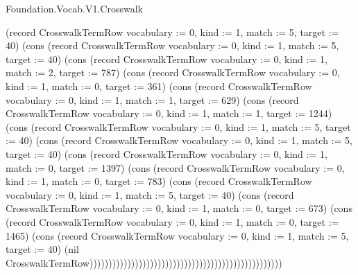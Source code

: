 \begin{lexlean}{Foundation.Vocab.V1.Crosswalk}
\begin{semanticmodule}
{(record CrosswalkTermRow {vocabulary := 0, kind := 1, match := 5, target := 40}) (cons (record CrosswalkTermRow {vocabulary := 0, kind := 1, match := 5, target := 40}) (cons (record CrosswalkTermRow {vocabulary := 0, kind := 1, match := 2, target := 787}) (cons (record CrosswalkTermRow {vocabulary := 0, kind := 1, match := 0, target := 361}) (cons (record CrosswalkTermRow {vocabulary := 0, kind := 1, match := 1, target := 629}) (cons (record CrosswalkTermRow {vocabulary := 0, kind := 1, match := 1, target := 1244}) (cons (record CrosswalkTermRow {vocabulary := 0, kind := 1, match := 5, target := 40}) (cons (record CrosswalkTermRow {vocabulary := 0, kind := 1, match := 5, target := 40}) (cons (record CrosswalkTermRow {vocabulary := 0, kind := 1, match := 0, target := 1397}) (cons (record CrosswalkTermRow {vocabulary := 0, kind := 1, match := 0, target := 783}) (cons (record CrosswalkTermRow {vocabulary := 0, kind := 1, match := 5, target := 40}) (cons (record CrosswalkTermRow {vocabulary := 0, kind := 1, match := 0, target := 673}) (cons (record CrosswalkTermRow {vocabulary := 0, kind := 1, match := 0, target := 1465}) (cons (record CrosswalkTermRow {vocabulary := 0, kind := 1, match := 5, target := 40}) (nil CrosswalkTermRow)))))))))))))))))))))))))))))))))))))))))))))))))))
}


\end{semanticmodule}
\end{lexlean}
